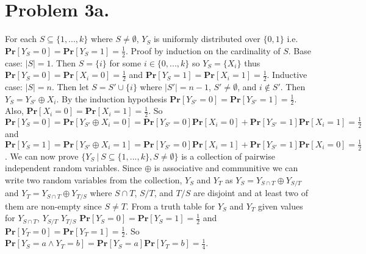 \documentclass[12pt]{article}
\begin{document}
\section*{Problem 3a.}
For each $S\subseteq \{1,...,k\}$ where $S\neq \emptyset$,
$Y_S$ is uniformly distributed over $\{0,1\}$ i.e.
$\textbf{Pr}[Y_S = 0] = \textbf{Pr}[Y_S = 1] = \frac{1}{2}$.
Proof by induction on the cardinality of $S$. Base case: $|S| = 1$.
Then $S = \{i\}$ for some $i \in \{0,...,k\}$ so $Y_S = \{X_i\}$ thus
$\textbf{Pr}[Y_S = 0] = \textbf{Pr}[X_i = 0] = \frac{1}{2}$ and 
$\textbf{Pr}[Y_S = 1] = \textbf{Pr}[X_i = 1] = \frac{1}{2}$.
Inductive case: $|S| = n$. Then let $S = S' \cup \{i\}$ where
$|S'| = n-1$, $S' \neq \emptyset$, and $i \notin S'$. Then
$Y_S = Y_{S'} \oplus X_i$. By the induction hypothesis 
$\textbf{Pr}[Y_{S'} = 0] = \textbf{Pr}[Y_{S'} = 1] = \frac{1}{2}$. Also,
$\textbf{Pr}[X_i = 0] = \textbf{Pr}[X_i = 1] = \frac{1}{2}$.
So $\textbf{Pr}[Y_S = 0] = \textbf{Pr}[Y_{S'} \oplus X_i = 0] =
\textbf{Pr}[Y_{S'} = 0]\textbf{Pr}[X_i = 0] +
\textbf{Pr}[Y_{S'} = 1]\textbf{Pr}[X_i = 1] = \frac{1}{2}$
and $\textbf{Pr}[Y_S = 1] = \textbf{Pr}[Y_{S'} \oplus X_i = 1] =
\textbf{Pr}[Y_{S'} = 0]\textbf{Pr}[X_i = 1] +
\textbf{Pr}[Y_{S'} = 1]\textbf{Pr}[X_i = 0] = \frac{1}{2}$. We can now prove
$\{Y_S\ |\ S\subseteq \{1,...,k\}, S\neq\emptyset \}$ is a collection of
pairwise independent random variables. Since $\oplus$ is associative and
communitive we can write two random variables from the collection,
$Y_S$ and $Y_T$ as $Y_S = Y_{S\cap T} \oplus Y_{S/T}$ and
$Y_T = Y_{S\cap T} \oplus Y_{T/S}$ where $S\cap T$, $S/T$, and $T/S$ are disjoint
and at least two of them are non-empty since $S \neq T$. From a truth table
for $Y_S$ and $Y_T$ given values for $Y_{S\cap T}$, $Y_{S/T}$ $Y_{T/S}$
$\textbf{Pr}[Y_S = 0] = \textbf{Pr}[Y_S = 1] = \frac{1}{2}$ and
$\textbf{Pr}[Y_T = 0] = \textbf{Pr}[Y_T = 1] = \frac{1}{2}$. So
$\textbf{Pr}[Y_S = a \wedge Y_T = b] = \textbf{Pr}[Y_S = a]\textbf{Pr}[Y_T = b]
= \frac{1}{4}$.

\newpage
\end{document}
